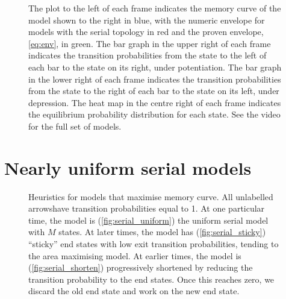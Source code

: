 \documentclass[12pt]{article}
\begin{document}
\begin{figure}[tbp]
{  The plot to the left of each frame indicates the memory curve of the model shown to the right in blue, with the numeric envelope for models with the serial topology in red and the proven envelope, \eqref{eq:env}, in green.
  The bar graph in the upper right of each frame indicates the transition probabilities from the state to the left of each bar to the state on its right, under potentiation.
  The bar graph in the lower right of each frame indicates the transition probabilities from the state to the right of each bar to the state on its left, under depression.
  The heat map in the centre right of each frame indicates the equilibrium probability distribution for each state.
  See the video for the full set of models.}\label{fig:envvid}
\end{figure}



\section{Nearly uniform serial models}\label{sec:serial}

\begin{figure}[tb]
  \centering
  \begin{myenuma}
    \item{}\hspace{0.02\linewidth}\label{fig:serial_uniform}
    \item{}\hspace{0.02\linewidth}\label{fig:serial_sticky}
    \item{}\label{fig:serial_shorten}
  \end{myenuma}
  \caption[Heuristic optimal models]{Heuristics for models that maximise memory curve.
  All unlabelled arrowshave transition probabilities equal to 1.
  At one particular time, the model is (\ref{fig:serial_uniform}) the uniform serial model with $M$ states.
  At later times, the model has (\ref{fig:serial_sticky}) ``sticky'' end states with low exit transition probabilities, tending to the area maximising model.
  At earlier times, the model is (\ref{fig:serial_shorten}) progressively shortened by reducing the transition probability to the end states.
  Once this reaches zero, we discard the old end state and work on the new end state.} \label{fig:heuristicmodels}
\end{figure}
\end{document}
